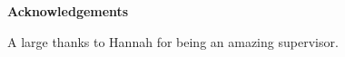 \thispagestyle{empty}

\begin{center}
    {\LARGE\bf Acknowledgements}
\end{center}

A large thanks to Hannah for being an amazing supervisor.
